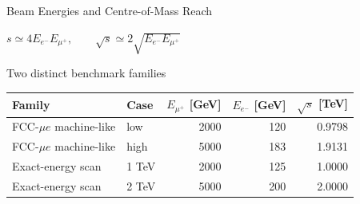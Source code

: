 \documentclass[aspectratio=1610,english]{beamer}
\newcommand{\src}[1]{\vfill{\par\color{black!65}\fontsize{6.4}{7.4}\selectfont\emph{Source:} #1\par}}
\newcommand{\key}[1]{\begin{alertblock}{Physics takeaway}\scriptsize #1\end{alertblock}}
\begin{document}







\begin{frame}[t]{Beam Energies and Centre-of-Mass Reach}
\small

\begin{center}\large
$\displaystyle s\simeq4E_{e^-}E_{\mu^+},\qquad \sqrt{s}\simeq 2\sqrt{E_{e^-}E_{\mu^+}}$
\end{center}
\begin{block}{Two distinct benchmark families}
\begin{center}\setlength{\tabcolsep}{6pt}
\begin{tabular}{llrrr}\toprule
Family & Case & $E_{\mu^+}$ [GeV] & $E_{e^-}$ [GeV] & $\sqrt{s}$ [TeV]\\\midrule
FCC-$\mu e$ machine-like & low & 2000 & 120 & 0.9798\\
FCC-$\mu e$ machine-like & high & 5000 & 183 & 1.9131\\
Exact-energy scan & 1 TeV & 2000 & 125 & 1.0000\\
Exact-energy scan & 2 TeV & 5000 & 200 & 2.0000\\\bottomrule
\end{tabular}\end{center}
\end{block}

\end{frame}
\end{document}
